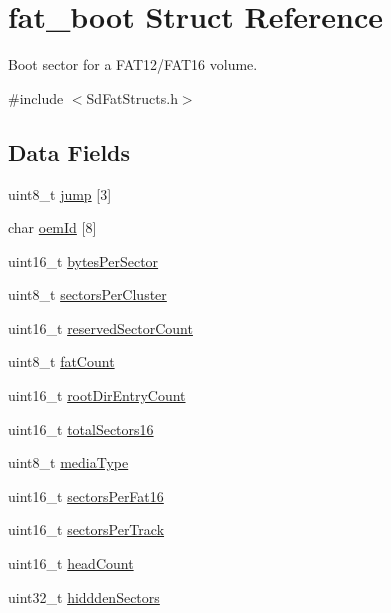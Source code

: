 \hypertarget{structfat__boot}{\section{fat\-\_\-boot Struct Reference}
\label{structfat__boot}
}


Boot sector for a F\-A\-T12/\-F\-A\-T16 volume.  




{\ttfamily \#include $<$Sd\-Fat\-Structs.\-h$>$}

\subsection*{Data Fields}
\begin{DoxyCompactItemize}
\item 
uint8\-\_\-t \hyperlink{structfat__boot_a61b95cffdd449d10352cfd0288b23287}{jump} \mbox{[}3\mbox{]}
\item 
char \hyperlink{structfat__boot_adff248465625d1fa3583bfcf2838620d}{oem\-Id} \mbox{[}8\mbox{]}
\item 
uint16\-\_\-t \hyperlink{structfat__boot_adb2ddeae74baf681103d21d724814a63}{bytes\-Per\-Sector}
\item 
uint8\-\_\-t \hyperlink{structfat__boot_a3ce07376c286acd8393a18a32d7ca4c0}{sectors\-Per\-Cluster}
\item 
uint16\-\_\-t \hyperlink{structfat__boot_a16c854faf567331bbbfb383e6c8df6f5}{reserved\-Sector\-Count}
\item 
uint8\-\_\-t \hyperlink{structfat__boot_a624e9eb125b4fc8aeaebcccf79e17aa8}{fat\-Count}
\item 
uint16\-\_\-t \hyperlink{structfat__boot_aabe25e54b9c06a9a7393fc6c475d9fa1}{root\-Dir\-Entry\-Count}
\item 
uint16\-\_\-t \hyperlink{structfat__boot_ad717f5b9af13f8ec9d0d6d1337174dfa}{total\-Sectors16}
\item 
uint8\-\_\-t \hyperlink{structfat__boot_ab88738f9cb91c882cb91d5e83a19a73f}{media\-Type}
\item 
uint16\-\_\-t \hyperlink{structfat__boot_abf85d1c57b01c8901a0cdcd0ac1babc2}{sectors\-Per\-Fat16}
\item 
uint16\-\_\-t \hyperlink{structfat__boot_a42886f9109ee1759d5972e871f0689a8}{sectors\-Per\-Track}
\item 
uint16\-\_\-t \hyperlink{structfat__boot_a57cb7e16b9969fa87c9f1ca43a87d217}{head\-Count}
\item 
uint32\-\_\-t \hyperlink{structfat__boot_a454fd6cc3f063c86b7fe65c367da7cdd}{hiddden\-Sectors}

\end{DoxyCompactItemize}
